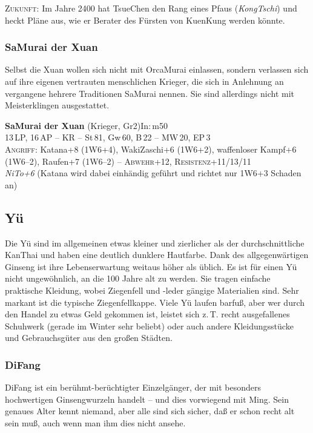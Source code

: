 \documentclass[
a4paper,
twoside,
DIV=calc,
BCOR=4mm,
fontsize=9pt,
twocolumn=on,
titlepage=on,
parskip=half
]{scrartcl}
\begin{document}
\textsc{Zukunft:} Im Jahre 2400 hat TsueChen den Rang eines Pfaus
(\emph{KongTschi}) und heckt Pläne aus, wie er Berater des Fürsten von
KuenKung werden könnte.

\subsubsection{SaMurai der Xuan}

Selbst die Xuan wollen sich nicht mit OrcaMurai einlassen, sondern
verlassen sich auf ihre eigenen vertrauten menschlichen Krieger, die
sich in Anlehnung an vergangene hehrere Traditionen SaMurai
nennen. Sie sind allerdings nicht mit Meisterklingen ausgestattet.

\textbf{SaMurai der Xuan} (Krieger, Gr2)\hfill In:\,m50\\
13\,LP, 16\,AP -- KR -- St\,81, Gw\,60, B\,22 -- MW\,20, EP\,3\\
\textsc{Angriff:} Katana+8 (1W6+4), WakiZaschi+6 (1W6+2), waffenloser
Kampf+6 (1W6--2), Raufen+7 (1W6--2) -- \textsc{Abwehr}+12,
\textsc{Resistenz}+11/13/11\\
\emph{NiTo+6} (Katana wird dabei einhändig geführt und richtet nur
1W6+3 Schaden an)

\subsection{Yü}

Die Yü sind im allgemeinen etwas kleiner und zierlicher als der
durchschnittliche KanThai und haben eine deutlich dunklere
Hautfarbe. Dank des allgegenwärtigen Ginseng ist ihre Lebenserwartung
weitaus höher als üblich. Es ist für einen Yü nicht ungewöhnlich, an die
100 Jahre alt zu werden. Sie tragen einfache praktische Kleidung,
wobei Ziegenfell und -leder gängige Materialien sind. Sehr markant ist
die typische Ziegenfellkappe. Viele Yü laufen barfuß, aber wer durch
den Handel zu etwas Geld gekommen ist, leistet sich z.\,T. recht
ausgefallenes Schuhwerk (gerade im Winter sehr beliebt) oder auch
andere Kleidungsstücke und Gebrauchsgüter aus den großen Städten.

\subsubsection{DiFang}

DiFang ist ein berühmt-berüchtigter Einzelgänger, der mit besonders
hochwertigen Ginsengwurzeln handelt -- und dies vorwiegend mit
Ming. Sein genaues Alter kennt niemand, aber alle sind sich sicher,
daß er schon recht alt sein muß, auch wenn man ihm dies nicht ansehe.
\end{document}
